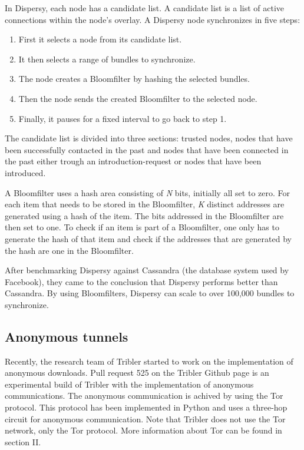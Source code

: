 		In Dispersy, each node has a candidate list. A candidate list is a list of active connections within the node's overlay. A Dispersy node synchronizes in five steps:
		
		\begin{enumerate}
			\item First it selects a node from its candidate list.
			\item It then selects a range of bundles to synchronize.
			\item The node creates a Bloomfilter by hashing the selected bundles.
			\item Then the node sends the created Bloomfilter to the selected node.
			\item Finally, it pauses for a fixed interval to go back to step 1.
		\end{enumerate}
		
		The candidate list is divided into three sections: trusted nodes, nodes that have been successfully contacted in the past and nodes that have been connected in the past either trough an introduction-request or nodes that have been introduced.
		
		A Bloomfilter uses a hash area consisting of \emph{N} bits, initially all set to zero. For each item that needs to be stored in the Bloomfilter, \emph{K} distinct addresses are generated using a hash of the item. The bits addressed in the Bloomfilter are then set to one. To check if an item is part of a Bloomfilter, one only has to generate the hash of that item and check if the addresses that are generated by the hash are one in the Bloomfilter.
		
		After benchmarking Dispersy against Cassandra (the database system used by Facebook), they came to the conclusion that Dispersy performs better than Cassandra. By using Bloomfilters, Dispersy can scale to over 100,000 bundles to synchronize.
		
	\subsection{Anonymous tunnels}
	\label{sec:anonymoustunnels}
		Recently, the research team of Tribler started to work on the implementation of anonymous downloads. Pull request 525 on the Tribler Github page \cite{pullrequest525} is an experimental build of Tribler with the implementation of anonymous communications. The anonymous communication is achived by using the Tor protocol. This protocol has been implemented in Python and uses a three-hop circuit for anonymous communication. Note that Tribler does not use the Tor network, only the Tor protocol. More information about Tor can be found in section II.
		
